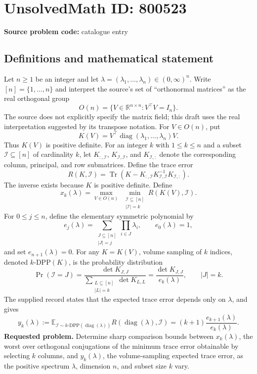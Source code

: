 \documentclass[11pt]{article}
\newcommand{\R}{\mathbb{R}}
\begin{document}
\section*{UnsolvedMath ID: 800523}
\textbf{Source problem code:} catalogue entry
\subsection{Definitions and mathematical statement}
Let \(n\geq 1\) be an integer and let \(\lambda=(\lambda_1,\ldots,\lambda_n)\in(0,\infty)^n\). Write \([n]=\{1,\ldots,n\}\) and interpret the source's set of ``orthonormal matrices'' as the real orthogonal group
\[
O(n)=\{V\in\R^{n\times n}:V^\top V=I_n\}.
\]
The source does not explicitly specify the matrix field; this draft uses the real interpretation suggested by its transpose notation. For \(V\in O(n)\), put
\[
K(V)=V^\top\operatorname{diag}(\lambda_1,\ldots,\lambda_n)V.
\]
Thus \(K(V)\) is positive definite. For an integer \(k\) with \(1\leq k\leq n\) and a subset \(\mathcal I\subseteq[n]\) of cardinality \(k\), let \(K_{:,\mathcal I}\), \(K_{\mathcal I,\mathcal I}\), and \(K_{\mathcal I,:}\) denote the corresponding column, principal, and row submatrices. Define the trace error
\[
R(K,\mathcal I)=\operatorname{Tr}\!\left(K-K_{:,\mathcal I}K_{\mathcal I,\mathcal I}^{-1}K_{\mathcal I,:}\right).
\]
The inverse exists because \(K\) is positive definite. Define
\[
x_k(\lambda)=\max_{V\in O(n)}\ \min_{\substack{\mathcal I\subseteq[n]\\|\mathcal I|=k}}R(K(V),\mathcal I).
\]
For \(0\leq j\leq n\), define the elementary symmetric polynomial by
\[
e_j(\lambda)=\sum_{\substack{J\subseteq[n]\\|J|=j}}\prod_{i\in J}\lambda_i,
\qquad e_0(\lambda)=1,
\]
and set \(e_{n+1}(\lambda)=0\). For any \(K=K(V)\), volume sampling of \(k\) indices, denoted \(k\text{-}\mathrm{DPP}(K)\), is the probability distribution
\[
\Pr(\mathcal I=J)=\frac{\det K_{J,J}}{\displaystyle\sum_{\substack{L\subseteq[n]\\|L|=k}}\det K_{L,L}}
=\frac{\det K_{J,J}}{e_k(\lambda)},\qquad |J|=k.
\]
The supplied record states that the expected trace error depends only on \(\lambda\), and gives
\[
y_k(\lambda):=\mathbb E_{\mathcal I\sim k\text{-}\mathrm{DPP}(\operatorname{diag}(\lambda))}
 R(\operatorname{diag}(\lambda),\mathcal I)
=(k+1)\frac{e_{k+1}(\lambda)}{e_k(\lambda)}.
\]
\textbf{Requested problem.} Determine sharp comparison bounds between \(x_k(\lambda)\), the worst over orthogonal conjugations of the minimum trace error obtainable by selecting \(k\) columns, and \(y_k(\lambda)\), the volume-sampling expected trace error, as the positive spectrum \(\lambda\), dimension \(n\), and subset size \(k\) vary.
\end{document}
